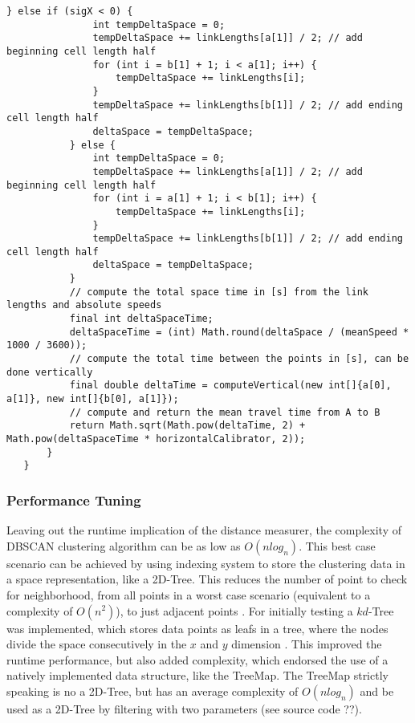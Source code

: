 \begin{lstlisting}[basicstyle=\tiny, style=java, caption={Implementation of \textit{diagonal distance calculation}}, label=lst:distance_calc_diagonal]
		   } else if (sigX < 0) {
			   int tempDeltaSpace = 0;
			   tempDeltaSpace += linkLengths[a[1]] / 2; // add beginning cell length half
			   for (int i = b[1] + 1; i < a[1]; i++) {
				   tempDeltaSpace += linkLengths[i];
			   }
			   tempDeltaSpace += linkLengths[b[1]] / 2; // add ending cell length half
			   deltaSpace = tempDeltaSpace;
		   } else {
			   int tempDeltaSpace = 0;
			   tempDeltaSpace += linkLengths[a[1]] / 2; // add beginning cell length half
			   for (int i = a[1] + 1; i < b[1]; i++) {
				   tempDeltaSpace += linkLengths[i];
			   }
			   tempDeltaSpace += linkLengths[b[1]] / 2; // add ending cell length half
			   deltaSpace = tempDeltaSpace;
		   }
		   // compute the total space time in [s] from the link lengths and absolute speeds
		   final int deltaSpaceTime;
		   deltaSpaceTime = (int) Math.round(deltaSpace / (meanSpeed * 1000 / 3600));
		   // compute the total time between the points in [s], can be done vertically
		   final double deltaTime = computeVertical(new int[]{a[0], a[1]}, new int[]{b[0], a[1]});
		   // compute and return the mean travel time from A to B
		   return Math.sqrt(Math.pow(deltaTime, 2) + Math.pow(deltaSpaceTime * horizontalCalibrator, 2));
	   }
   }
\end{lstlisting}


\subsubsection{Performance Tuning}
Leaving out the runtime implication of the distance measurer, the complexity of DBSCAN clustering algorithm can be as low as $O(nlog_n)$. This best case scenario can be achieved by using indexing system to store the clustering data in a space representation, like a 2D-Tree. This reduces the number of point to check for neighborhood, from all points in a worst case scenario (equivalent to a complexity of $O(n^2)$), to just adjacent points \parencite{Chauhan2020}. For initially testing a $kd$-Tree was implemented, which stores data points as leafs in a tree, where the nodes divide the space consecutively in the $x$ and $y$ dimension \parencite{Hucker2020,Dalitz2009}. This improved the runtime performance, but also added complexity, which endorsed the use of a natively implemented data structure, like the TreeMap. The TreeMap strictly speaking is no a 2D-Tree, but has an average complexity of $O(nlog_n)$ and be used as a 2D-Tree by filtering with two parameters (see source code ??). \parencite{Baeldung2020_1,Baeldung2020_2}

